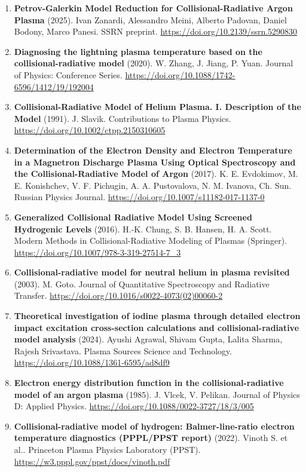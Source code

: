 \documentclass[11pt,a4paper]{article}
\begin{document}
\begin{enumerate}[leftmargin=1.4em]
\item \textbf{Petrov-Galerkin Model Reduction for Collisional-Radiative Argon Plasma} (2025). Ivan Zanardi, Alessandro Meini, Alberto Padovan, Daniel Bodony, Marco Panesi. SSRN preprint. \url{https://doi.org/10.2139/ssrn.5290830}
\item \textbf{Diagnosing the lightning plasma temperature based on the collisional-radiative model} (2020). W. Zhang, J. Jiang, P. Yuan. Journal of Physics: Conference Series. \url{https://doi.org/10.1088/1742-6596/1412/19/192004}
\item \textbf{Collisional-Radiative Model of Helium Plasma. I. Description of the Model} (1991). J. Slavik. Contributions to Plasma Physics. \url{https://doi.org/10.1002/ctpp.2150310605}
\item \textbf{Determination of the Electron Density and Electron Temperature in a Magnetron Discharge Plasma Using Optical Spectroscopy and the Collisional-Radiative Model of Argon} (2017). K. E. Evdokimov, M. E. Konishchev, V. F. Pichugin, A. A. Pustovalova, N. M. Ivanova, Ch. Sun. Russian Physics Journal. \url{https://doi.org/10.1007/s11182-017-1137-0}
\item \textbf{Generalized Collisional Radiative Model Using Screened Hydrogenic Levels} (2016). H.-K. Chung, S. B. Hansen, H. A. Scott. Modern Methods in Collisional-Radiative Modeling of Plasmas (Springer). \url{https://doi.org/10.1007/978-3-319-27514-7_3}
\item \textbf{Collisional-radiative model for neutral helium in plasma revisited} (2003). M. Goto. Journal of Quantitative Spectroscopy and Radiative Transfer. \url{https://doi.org/10.1016/s0022-4073(02)00060-2}
\item \textbf{Theoretical investigation of iodine plasma through detailed electron impact excitation cross-section calculations and collisional-radiative model analysis} (2024). Ayushi Agrawal, Shivam Gupta, Lalita Sharma, Rajesh Srivastava. Plasma Sources Science and Technology. \url{https://doi.org/10.1088/1361-6595/ad8df9}
\item \textbf{Electron energy distribution function in the collisional-radiative model of an argon plasma} (1985). J. Vlcek, V. Pelikan. Journal of Physics D: Applied Physics. \url{https://doi.org/10.1088/0022-3727/18/3/005}
\item \textbf{Collisional-radiative model of hydrogen: Balmer-line-ratio electron temperature diagnostics (PPPL/PPST report)} (2022). Vinoth S. et al.. Princeton Plasma Physics Laboratory (PPST). \url{https://w3.pppl.gov/ppst/docs/vinoth.pdf}
\end{enumerate}
\end{document}
